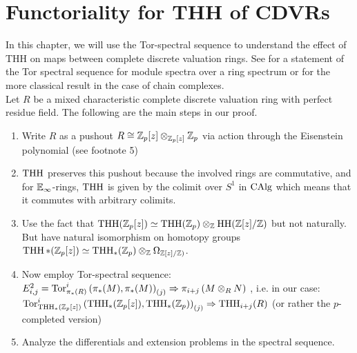 \chapter{Functoriality for THH of CDVRs}
In this chapter, we will use the Tor-spectral sequence to understand the effect of THH on maps between complete discrete valuation rings.
See \cite[~Proposition 7.2.1.19]{lurie2017higher} for a statement of the Tor spectral sequence for module spectra over a ring spectrum 
or \cite[\href{https://stacks.math.columbia.edu/tag/061Y}{Tag 061Y}]{stacks-project} for the more classical result in the case of chain complexes.
\\
Let $R$ be a mixed characteristic complete discrete valuation ring with perfect residue field. The following are the main steps in our proof.
\begin{enumerate}
    \item Write $R$ as a pushout $R\cong\mathbb{Z}_p[z]\otimes_{\mathbb{Z}_p[z]}\mathbb{Z}_p$ via action through the Eisenstein polynomial (see footnote 5)
    \item $\operatorname{THH}$ preserves this pushout because the involved rings are commutative, and for $\mathbb{E}_\infty$-rings, $\operatorname{THH}$ is given by the colimit over $S^1$ in $\operatorname{CAlg}$ which means that it commutes with arbitrary colimits.
    \item Use the fact that $\operatorname{THH}(\mathbb{Z}_p[z])\simeq \operatorname{THH}(\mathbb{Z}_p)\otimes_{\mathbb{Z}} \operatorname{HH}(\mathbb{Z}[z]/\mathbb{Z})$ but not naturally. But have natural isomorphism on homotopy groups
    $\operatorname{THH}*(\mathbb{Z}_p[z])\simeq \operatorname{THH}_*(\mathbb{Z}_p)\otimes_{\mathbb{Z}} \Omega_{\mathbb{Z}[z]/\mathbb{Z})}$.
    \item Now employ Tor-spectral sequence:\\
     $E^2_{i,j}=\operatorname{Tor}_{\pi_*(R)}^i\left( \pi_*(M), \pi_*(M)\right)_{(j)}\Rightarrow \pi_{i+j}\left( M\otimes_R N \right)$
    , i.e. in our case: 
    \\
    $\operatorname{Tor}_{\operatorname{THH}_*(\mathbb{Z}_p[z])}^i\left( \operatorname{THH}_*(\mathbb{Z}_p[z]),\operatorname{THH}_*(\mathbb{Z}_p)\right)_{(j)}\Rightarrow \operatorname{THH}_{i+j}(R)$ (or rather the $p$-completed version)
    \item Analyze the differentials and extension problems in the spectral sequence.
\end{enumerate}
